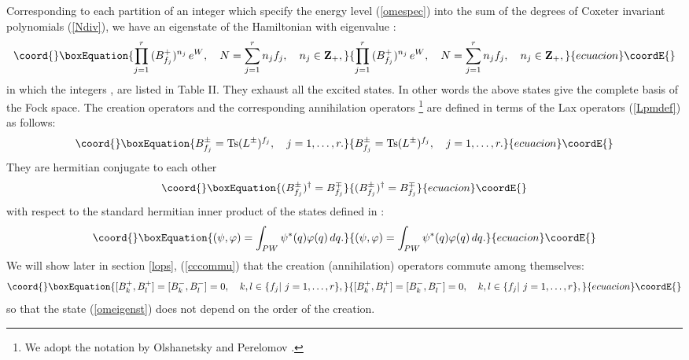 \documentclass[a4paper,12pt]{article}
\begin{document}
Corresponding to each partition of an integer \coordHE{}
which specify the energy level
(\ref{omespec}) into the sum of the degrees of Coxeter
invariant polynomials
(\ref{Ndiv}), we have an eigenstate of the Hamiltonian \coordHE{}
with eigenvalue \coordHE{}:
\begin{equation}\coord{}\boxEquation{
   \prod_{j=1}^r\,(B_{f_j}^+)^{n_{j}}\,e^W,\quad
   N=\sum_{j=1}^rn_j f_j,\quad n_j\in{\bf Z}_+,
   \label{omeigenst}
}{
   \prod_{j=1}^r\,(B_{f_j}^+)^{n_{j}}\,e^W,\quad
   N=\sum_{j=1}^rn_j f_j,\quad n_j\in{\bf Z}_+,
   }{ecuacion}\coordE{}\end{equation}
in which the integers \coordHE{}, \coordHE{} are listed in Table II.
They exhaust all the excited states.
In other words the above states give the complete basis of the Fock space.
The creation operators \coordHE{}
 and the corresponding annihilation operators
\footnote{We adopt the notation by Olshanetsky and Perelomov
\cite{OP2,Pere1}.}
 \coordHE{}
are defined in terms of the Lax operators \coordHE{}
(\ref{Lpmdef}) as follows:
\begin{equation}\coord{}\boxEquation{
   B_{f_j}^{\pm}=\mbox{Ts}(L^{\pm})^{f_j},\quad
   j=1,\ldots,r.
   \label{Bcrandef}
}{
   B_{f_j}^{\pm}=\mbox{Ts}(L^{\pm})^{f_j},\quad
   j=1,\ldots,r.
   }{ecuacion}\coordE{}\end{equation}
They are hermitian conjugate to each other
\begin{equation}\coord{}\boxEquation{
   (B_{f_j}^\pm)^\dagger=B_{f_j}^\mp
}{
   (B_{f_j}^\pm)^\dagger=B_{f_j}^\mp
}{ecuacion}\coordE{}\end{equation}
with respect to the standard hermitian inner product
of the states defined in \coordHE{}:
\begin{equation}\coord{}\boxEquation{
   (\psi,\varphi)=\int_{PW}\psi^*(q)\varphi(q)\,dq.
   \label{scalprodef}
}{
   (\psi,\varphi)=\int_{PW}\psi^*(q)\varphi(q)\,dq.
   }{ecuacion}\coordE{}\end{equation}
We will show later in section \ref{lops}, (\ref{cccommu}) that the
creation (annihilation) operators commute among themselves:
\begin{equation}\coord{}\boxEquation{
[B_k^+,B_l^+]=[B_k^-,B_l^-]=0,\quad k,l\in\{f_j|\ j=1,\ldots,r\},
}{
[B_k^+,B_l^+]=[B_k^-,B_l^-]=0,\quad k,l\in\{f_j|\ j=1,\ldots,r\},
}{ecuacion}\coordE{}\end{equation}
so that the state (\ref{omeigenst}) does not
depend on the order of the creation.
\end{document}
